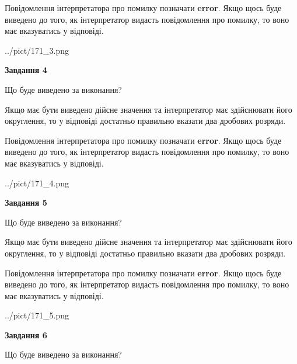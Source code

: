 \documentclass[12pt, ukrainian]{article}
\begin{document}
{\begin {Large}
Повідомлення інтерпретатора про помилку позначати \textbf{error}.
Якщо щось буде виведено до того, як інтерпретатор видасть повідомлення про помилку, 
то воно має вказуватись у відповіді. \par

\begin{center}
	{../pict/171_3.png}
\end{center}
\newpage

{\begin {center}\textbf{Завдання 4}\end {center}}\par
Що буде виведено за виконання? \par

Якщо має бути виведено дійсне значення та інтерпретатор має здійснювати його округлення, 
то у відповіді достатньо правильно вказати два дробових розряди.

Повідомлення інтерпретатора про помилку позначати \textbf{error}.
Якщо щось буде виведено до того, як інтерпретатор видасть повідомлення про помилку, 
то воно має вказуватись у відповіді. \par

\begin{center}
	{../pict/171_4.png}
\end{center}
\newpage

{\begin {center}\textbf{Завдання 5}\end {center}}\par
Що буде виведено за виконання? \par

Якщо має бути виведено дійсне значення та інтерпретатор має здійснювати його округлення, 
то у відповіді достатньо правильно вказати два дробових розряди.

Повідомлення інтерпретатора про помилку позначати \textbf{error}.
Якщо щось буде виведено до того, як інтерпретатор видасть повідомлення про помилку, 
то воно має вказуватись у відповіді. \par

\begin{center}
	{../pict/171_5.png}
\end{center}
\newpage

{\begin {center}\textbf{Завдання 6}\end {center}}\par
Що буде виведено за виконання? \par


\end{Large}}
\end{document}
